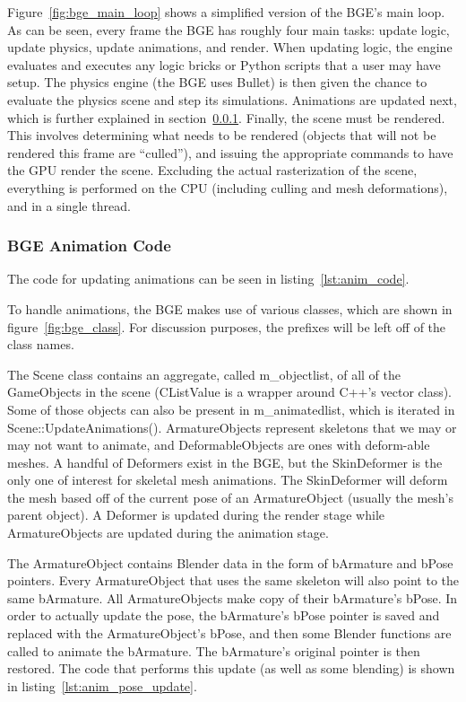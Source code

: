Figure~\ref{fig:bge_main_loop} shows a simplified version of the BGE's main loop.
As can be seen, every frame the BGE has roughly four main tasks: update logic, update physics, update animations, and render.
When updating logic, the engine evaluates and executes any logic bricks or Python scripts that a user may have setup.
The physics engine (the BGE uses Bullet) is then given the chance to evaluate the physics scene and step its simulations.
Animations are updated next, which is further explained in section~\ref{sec:bge_anim_overview}.
Finally, the scene must be rendered.
This involves determining what needs to be rendered (objects that will not be rendered this frame are ``culled''), and issuing the appropriate commands to have the GPU render the scene.
Excluding the actual rasterization of the scene, everything is performed on the CPU (including culling and mesh deformations), and in a single thread.

\subsubsection{BGE Animation Code}
\label{sec:bge_anim_overview}

The code for updating animations can be seen in listing~\ref{lst:anim_code}.


To handle animations, the BGE makes use of various classes, which are shown in figure~\ref{fig:bge_class}.
For discussion purposes, the prefixes will be left off of the class names.


The Scene class contains an aggregate, called m\_objectlist, of all of the GameObjects in the scene (CListValue is a wrapper around C++'s vector class).
Some of those objects can also be present in m\_animatedlist, which is iterated in Scene::UpdateAnimations().
ArmatureObjects represent skeletons that we may or may not want to animate, and DeformableObjects are ones with deform-able meshes.
A handful of Deformers exist in the BGE, but the SkinDeformer is the only one of interest for skeletal mesh animations.
The SkinDeformer will deform the mesh based off of the current pose of an ArmatureObject (usually the mesh's parent object).
A Deformer is updated during the render stage while ArmatureObjects are updated during the animation stage.

The ArmatureObject contains Blender data in the form of bArmature and bPose pointers.
Every ArmatureObject that uses the same skeleton will also point to the same bArmature.
All ArmatureObjects make copy of their bArmature's bPose.
In order to actually update the pose, the bArmature's bPose pointer is saved and replaced with the ArmatureObject's bPose, and then some Blender functions are called to animate the bArmature.
The bArmature's original pointer is then restored.
The code that performs this update (as well as some blending) is shown in listing~\ref{lst:anim_pose_update}.

